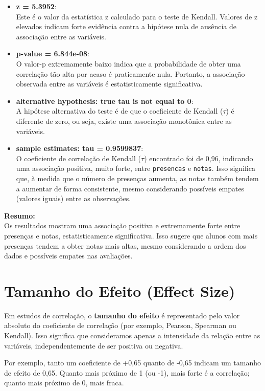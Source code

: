 \documentclass[
]{book}
\begin{document}
\begin{itemize}
\item
  \textbf{z = 5.3952}:\\
  Este é o valor da estatística z calculado para o teste de Kendall. Valores de z elevados indicam forte evidência contra a hipótese nula de ausência de associação entre as variáveis.
\item
  \textbf{p-value = 6.844e-08}:\\
  O valor-p extremamente baixo indica que a probabilidade de obter uma correlação tão alta por acaso é praticamente nula. Portanto, a associação observada entre as variáveis é estatisticamente significativa.
\item
  \textbf{alternative hypothesis: true tau is not equal to 0}:\\
  A hipótese alternativa do teste é de que o coeficiente de Kendall (\(\tau\)) é diferente de zero, ou seja, existe uma associação monotônica entre as variáveis.
\item
  \textbf{sample estimates: tau = 0.9599837}:\\
  O coeficiente de correlação de Kendall (\(\tau\)) encontrado foi de 0,96, indicando uma associação positiva, muito forte, entre \texttt{presencas} e \texttt{notas}. Isso significa que, à medida que o número de presenças aumenta, as notas também tendem a aumentar de forma consistente, mesmo considerando possíveis empates (valores iguais) entre as observações.
\end{itemize}

\textbf{Resumo:}\\
Os resultados mostram uma associação positiva e extremamente forte entre presenças e notas, estatisticamente significativa. Isso sugere que alunos com mais presenças tendem a obter notas mais altas, mesmo considerando a ordem dos dados e possíveis empates nas avaliações.

\section{Tamanho do Efeito (Effect Size)}\label{tamanho-do-efeito-effect-size}

Em estudos de correlação, o \textbf{tamanho do efeito} é representado pelo valor absoluto do coeficiente de correlação (por exemplo, Pearson, Spearman ou Kendall). Isso significa que consideramos apenas a intensidade da relação entre as variáveis, independentemente de ser positiva ou negativa.

Por exemplo, tanto um coeficiente de +0,65 quanto de -0,65 indicam um tamanho de efeito de 0,65. Quanto mais próximo de 1 (ou -1), mais forte é a correlação; quanto mais próximo de 0, mais fraca.
\end{document}
